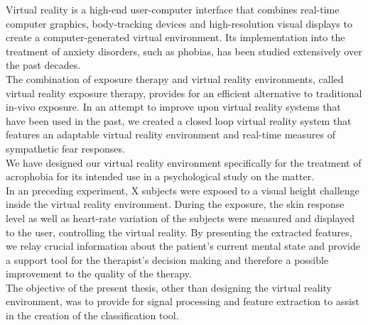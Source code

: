 
Virtual reality is a high-end user-computer interface that combines real-time computer graphics, body-tracking devices and high-resolution visual displays to create a computer-generated virtual environment. Its implementation into the treatment of anxiety disorders, such as phobias, has been studied extensively over the past decades. \\
The combination of exposure therapy and virtual reality environments, called virtual reality exposure therapy, provides for an efficient alternative to traditional in-vivo exposure. In an attempt to improve upon virtual reality systems that have been used in the past, we created a closed loop virtual reality system that features an adaptable virtual reality environment and real-time measures of sympathetic fear responses. \\
We have designed our virtual reality environment specifically for the treatment of acrophobia for its intended use in a psychological study on the matter.\\
In an preceding experiment, X subjects were exposed to a visual height challenge inside the virtual reality environment. During the exposure, the skin response level as well as heart-rate variation of the subjects were measured and displayed to the user, controlling the virtual reality. By presenting the extracted features, we relay crucial information about the patient's current mental state and provide a support tool for the therapist's decision making and therefore a possible improvement to the quality of the therapy. \\
The objective of the present thesis, other than designing the virtual reality environment, was to provide for signal processing and feature extraction to assist in the creation of the classification tool.   









